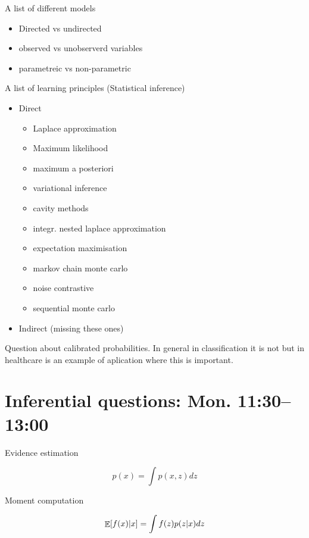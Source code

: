 \documentclass[b5paper]{report}
\begin{document}
A list of different models

\begin{itemize}
  \item Directed vs undirected
  \item observed vs unobserverd variables
  \item parametreic vs non-parametric
\end{itemize}

A list of learning principles (Statistical inference)

\begin{itemize}
  \item Direct
    \begin{itemize}
      \item Laplace approximation
      \item Maximum likelihood
      \item maximum a posteriori
      \item variational inference
      \item cavity methods
      \item integr. nested laplace approximation
      \item expectation maximisation
      \item markov chain monte carlo
      \item noise contrastive
      \item sequential monte carlo
    \end{itemize}
  \item Indirect (missing these ones)
\end{itemize}

Question about calibrated probabilities. In general in classification it is not
but in healthcare is an example of aplication where this is important.

\section{Inferential questions: Mon. 11:30--13:00}

Evidence estimation

\begin{equation}
  p(x) = \int p(x,z)dz
\end{equation}

Moment computation

\begin{equation}
  \operatorname*{\mathbb{\mathop{E}}} [f(x) | x] = \int f(z)p(z|x) d z
\end{equation}
\end{document}
